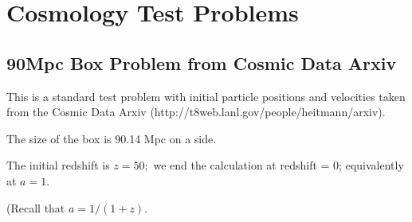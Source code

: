 
\section{Cosmology Test Problems}

\subsection{90Mpc Box Problem from Cosmic Data Arxiv} 

\noindent This is a standard test problem with initial particle positions and velocities
taken from the Cosmic Data Arxiv (http://t8web.lanl.gov/people/heitmann/arxiv). 

\noindent The size of the box is 90.14 Mpc on a side.

\noindent The initial redshift is $z=50;$ we end the calculation at redshift = 0; equivalently at $a = 1.$

\noindent (Recall that $a = 1 / (1+z).$

